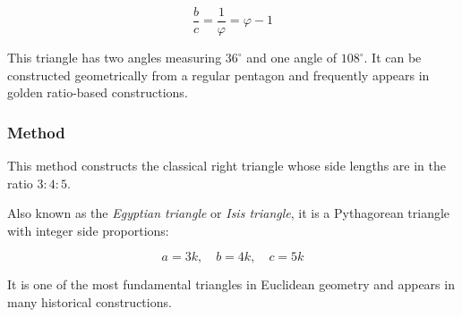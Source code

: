 \[
\dfrac{b}{c} = \frac{1}{\varphi} = \varphi - 1
\]


This triangle has two angles measuring $36^\circ$ and one angle of $108^\circ$. It can be constructed geometrically from a regular pentagon and frequently appears in golden ratio-based constructions.

\vspace{1em}

\begin{minipage}{.5\textwidth}
\begin{center}
\end{center}
\end{minipage}
\begin{minipage}{.5\textwidth}
\begin{tkzexample}
\end{tkzexample}
\end{minipage}

\subsubsection{Method }
\label{ssub:_line_egyptian}

This method constructs the classical right triangle whose side lengths are in the ratio $3\mathbin{:}4\mathbin{:}5$.

\medskip

Also known as the \emph{Egyptian triangle} or \emph{Isis triangle}, it is a Pythagorean triangle with integer side proportions:

\[
a = 3k,\quad b = 4k,\quad c = 5k
\]


It is one of the most fundamental triangles in Euclidean geometry and appears in many historical constructions.

\vspace{1em}

